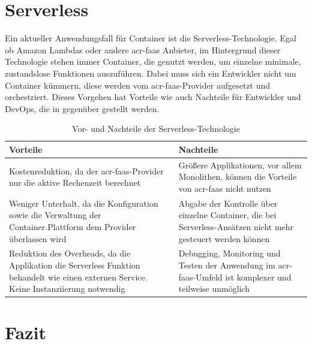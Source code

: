 \section{Serverless}
\label{sec:aktuellesServerless}

Ein aktueller Anwendungsfall für Container ist die Serverless-Technologie. Egal ob Amazon Lambdas oder andere \gls{acr-faas} Anbieter, im Hintergrund dieser Technologie stehen immer Container, die genutzt werden, um einzelne minimale, zustandslose Funktionen auszuführen. Dabei muss sich ein Entwickler nicht um Container kümmern, diese werden vom \gls{acr-faas}-Provider aufgesetzt und orchestriert. Dieses Vorgehen hat Vorteile wie auch Nachteile für Entwickler und DevOps, die in  gegenüber gestellt werden.

\begin{table}[h]
	\renewcommand{\arraystretch}{2.5}
	\begin{center}
		\begin{tabu} to 0.9
			\toprule
			Vorteile & Nachteile\\
			\midrule
			Kostenreduktion, da der \gls{acr-faas}-Provider nur die aktive Rechenzeit berechnet & Größere Applikationen, vor allem Monolithen, können die Vorteile von \gls{acr-faas} nicht nutzen\\
			Weniger Unterhalt, da die Konfiguration sowie die Verwaltung der Container.Plattform dem Provider überlassen wird & Abgabe der Kontrolle über einzelne Container, die bei Serverless-Ansätzen nicht mehr gesteuert werden können\\
			Reduktion des Overheads, da die Applikation die Serverless Funktion behandelt wie einen externen Service. Keine Instanziierung notwendig & Debugging, Monitoring und Testen der Anwendung im \gls{acr-faas}-Umfeld ist komplexer und teilweise unmöglich\\
			\bottomrule
		\end{tabu}
		\caption{Vor- und Nachteile der Serverless-Technologie \citep{ContainersVsServerlessComputing}}
		\label{tab:serverlessAdvantagesDisadvantages}
	\end{center}
\end{table}

\pagebreak

\section{Fazit}
\label{sec:aktuellesFazit}

